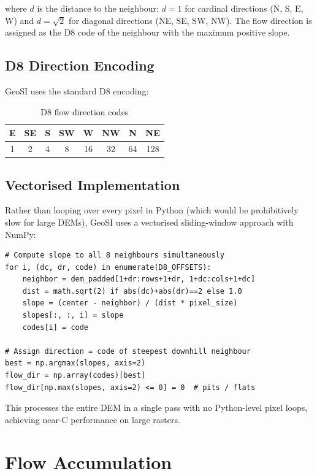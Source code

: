 \noindent where $d$ is the distance to the neighbour: $d = 1$ for cardinal
directions (N, S, E, W) and $d = \sqrt{2}$ for diagonal directions (NE, SE, SW,
NW).  The flow direction is assigned as the D8 code of the neighbour with the
maximum positive slope.

\subsection{D8 Direction Encoding}

GeoSI uses the standard D8 encoding:

\begin{table}[ht]
\centering
\caption{D8 flow direction codes}
\begin{tabular}{cccccccc}
\toprule
\textbf{E} & \textbf{SE} & \textbf{S} & \textbf{SW} & \textbf{W} & \textbf{NW} & \textbf{N} & \textbf{NE} \\
\midrule
1 & 2 & 4 & 8 & 16 & 32 & 64 & 128 \\
\bottomrule
\end{tabular}
\end{table}

\subsection{Vectorised Implementation}

Rather than looping over every pixel in Python (which would be prohibitively slow
for large DEMs), GeoSI uses a vectorised sliding-window approach with NumPy:

\begin{lstlisting}
# Compute slope to all 8 neighbours simultaneously
for i, (dc, dr, code) in enumerate(D8_OFFSETS):
    neighbor = dem_padded[1+dr:rows+1+dr, 1+dc:cols+1+dc]
    dist = math.sqrt(2) if abs(dc)+abs(dr)==2 else 1.0
    slope = (center - neighbor) / (dist * pixel_size)
    slopes[:, :, i] = slope
    codes[i] = code

# Assign direction = code of steepest downhill neighbour
best = np.argmax(slopes, axis=2)
flow_dir = np.array(codes)[best]
flow_dir[np.max(slopes, axis=2) <= 0] = 0  # pits / flats
\end{lstlisting}

This processes the entire DEM in a single pass with no Python-level pixel loops,
achieving near-C performance on large rasters.

\section{Flow Accumulation}

